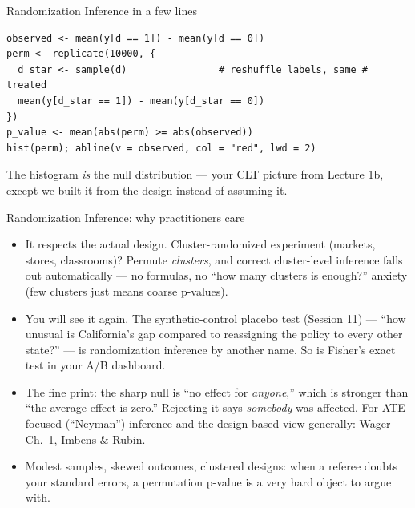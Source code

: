 \documentclass[aspectratio=169,11pt]{beamer}
\begin{document}
\begin{frame}[fragile]{Randomization Inference in a few lines}
\begin{lstlisting}
observed <- mean(y[d == 1]) - mean(y[d == 0])
perm <- replicate(10000, {
  d_star <- sample(d)                # reshuffle labels, same # treated
  mean(y[d_star == 1]) - mean(y[d_star == 0])
})
p_value <- mean(abs(perm) >= abs(observed))
hist(perm); abline(v = observed, col = "red", lwd = 2)
\end{lstlisting}
\medskip
The histogram \emph{is} the null distribution --- your CLT picture from Lecture 1b,
except we built it from the design instead of assuming it.
\end{frame}


\begin{frame}{Randomization Inference: why practitioners care}
\begin{itemize}
	\item \alert{It respects the actual design.} Cluster-randomized experiment
	(markets, stores, classrooms)? Permute \emph{clusters}, and correct
	cluster-level inference falls out automatically --- no formulas, no ``how many
	clusters is enough?'' anxiety (few clusters just means coarse p-values).

	\medskip
	\item \alert{You will see it again.} The synthetic-control placebo test
	(Session 11) --- ``how unusual is California's gap compared to reassigning the
	policy to every other state?'' --- is randomization inference by another name.
	So is Fisher's exact test in your A/B dashboard.

	\medskip
	\item \alert{The fine print:} the sharp null is ``no effect for \emph{anyone},''
	which is stronger than ``the average effect is zero.'' Rejecting it says
	\emph{somebody} was affected. For ATE-focused (``Neyman'') inference and the
	design-based view generally: Wager Ch.~1, Imbens \& Rubin.

	\medskip
	\item Modest samples, skewed outcomes, clustered designs: when a referee doubts
	your standard errors, a permutation p-value is a very hard object to argue with.
\end{itemize}
\end{frame}
\end{document}
